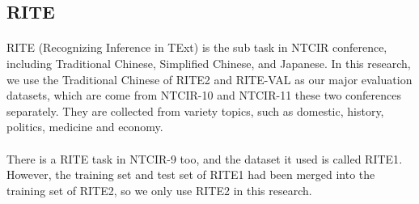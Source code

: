 \documentclass[12pt]{article}
\begin{document}
\begin{CJK*}{UTF8}{bkai}
\begin{spacing}{1.77}
\subsection{RITE}
\paragraph{}
RITE (Recognizing Inference in TExt) is the sub task in NTCIR conference, including Traditional Chinese, Simplified Chinese, and Japanese. In this research, we use the Traditional Chinese of RITE2 and RITE-VAL as our major evaluation datasets, which are come from NTCIR-10\cite{ntcir10rite2} and NTCIR-11\cite{ntcir11rite-val} these two conferences separately. They are collected from variety topics, such as domestic, history, politics, medicine and economy.

\paragraph{}
There is a RITE task in NTCIR-9 too, and the dataset it used is called RITE1\cite{ntcir9rite1}. However, the training set and test set of RITE1 had been merged into the training set of RITE2, so we only use RITE2 in this research.


\end{spacing}
\end{CJK*}
\end{document}
